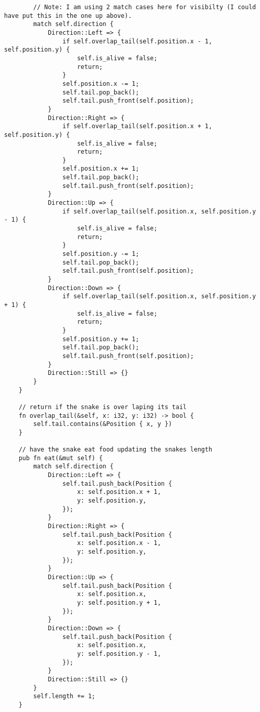 \documentclass{article}
\begin{document}
\begin{verbatim}
        // Note: I am using 2 match cases here for visibilty (I could have put this in the one up above).
        match self.direction {
            Direction::Left => {
                if self.overlap_tail(self.position.x - 1, self.position.y) {
                    self.is_alive = false;
                    return;
                }
                self.position.x -= 1;
                self.tail.pop_back();
                self.tail.push_front(self.position);
            }
            Direction::Right => {
                if self.overlap_tail(self.position.x + 1, self.position.y) {
                    self.is_alive = false;
                    return;
                }
                self.position.x += 1;
                self.tail.pop_back();
                self.tail.push_front(self.position);
            }
            Direction::Up => {
                if self.overlap_tail(self.position.x, self.position.y - 1) {
                    self.is_alive = false;
                    return;
                }
                self.position.y -= 1;
                self.tail.pop_back();
                self.tail.push_front(self.position);
            }
            Direction::Down => {
                if self.overlap_tail(self.position.x, self.position.y + 1) {
                    self.is_alive = false;
                    return;
                }
                self.position.y += 1;
                self.tail.pop_back();
                self.tail.push_front(self.position);
            }
            Direction::Still => {}
        }
    }

    // return if the snake is over laping its tail
    fn overlap_tail(&self, x: i32, y: i32) -> bool {
        self.tail.contains(&Position { x, y })
    }

    // have the snake eat food updating the snakes length
    pub fn eat(&mut self) {
        match self.direction {
            Direction::Left => {
                self.tail.push_back(Position {
                    x: self.position.x + 1,
                    y: self.position.y,
                });
            }
            Direction::Right => {
                self.tail.push_back(Position {
                    x: self.position.x - 1,
                    y: self.position.y,
                });
            }
            Direction::Up => {
                self.tail.push_back(Position {
                    x: self.position.x,
                    y: self.position.y + 1,
                });
            }
            Direction::Down => {
                self.tail.push_back(Position {
                    x: self.position.x,
                    y: self.position.y - 1,
                });
            }
            Direction::Still => {}
        }
        self.length += 1;
    }


\end{verbatim}
\end{document}
